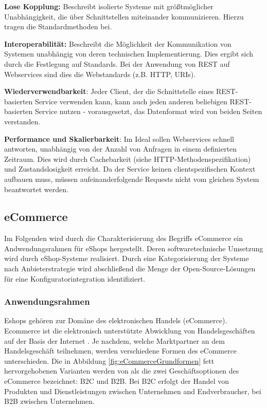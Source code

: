 \documentclass[12pt,a4paper,bibliography=totocnumbered,listof=totoc]{scrartcl}
\begin{document}
\begin{compactitem}
\item \textbf{Lose Kopplung:} Beschreibt isolierte Systeme mit größtmöglicher Unabhängigkeit, die über Schnittstellen miteinander kommunizieren. Hierzu tragen die Standardmethoden bei.
\item \textbf{Interoperabilität:} Beschreibt die Möglichkeit der Kommunikation von Systemen unabhängig von deren technischen Implementierung. Dies ergibt sich durch die Festlegung auf Standards. Bei der Anwendung von REST auf Webservices sind dies die Webstandards (z.B. HTTP, URIs).
\item \textbf{Wiederverwendbarkeit}: Jeder Client, der die Schnittstelle eines REST-basierten Service verwenden kann, kann auch jeden anderen beliebigen REST-basierten Service nutzen - vorausgesetzt, das Datenformat wird von beiden Seiten verstanden.
\item \textbf{Performance und Skalierbarkeit}: Im Ideal sollen Webservices schnell antworten, unabhängig von der Anzahl von Anfragen in einem definierten Zeitraum. Dies wird durch Cachebarkeit (siehe HTTP-Methodenspezifikation) und Zustandslosigkeit erreicht. Da der Service keinen clientspezifischen Kontext aufbauen muss, müssen aufeinanderfolgende Requests nicht vom gleichen System beantwortet werden.
\end{compactitem}
\pagebreak

\subsection{eCommerce}

Im Folgenden wird durch die Charakterisierung des Begriffs eCommerce ein Andwendungsrahmen für eShops hergestellt. Deren softwaretechnische Umsetzung wird durch eShop-Systeme realisiert. Durch eine Kategorisierung der Systeme nach Anbieterstrategie wird abschließend die Menge der Open-Source-Lösungen für eine Konfiguratorintegration identifiziert.

\subsubsection{Anwendungsrahmen}
Eshops gehören zur Domäne des elektronischen Handels (eCommerce). Ecommerce ist \glqq die elektronisch unterstützte Abwicklung von Handelsgeschäften auf der Basis der Internet\grqq{} \citep{schwarze02}. Je nachdem, welche Marktpartner an dem Handelsgeschäft teilnehmen, werden verschiedene Formen des eCommerce unterschieden. Die in Abbildung \ref{fig:eCommerceGrundformen} fett hervorgehobenen Varianten werden von \citet{meier12} als \glqq die zwei Geschäftsoptionen des eCommerce\grqq{} bezeichnet: \ac{B2C} und \ac{B2B}. Bei \ac{B2C} erfolgt der Handel von Produkten und Dienstleistungen zwischen Unternehmen and Endverbraucher, bei \ac{B2B} zwischen Unternehmen.
\end{document}
